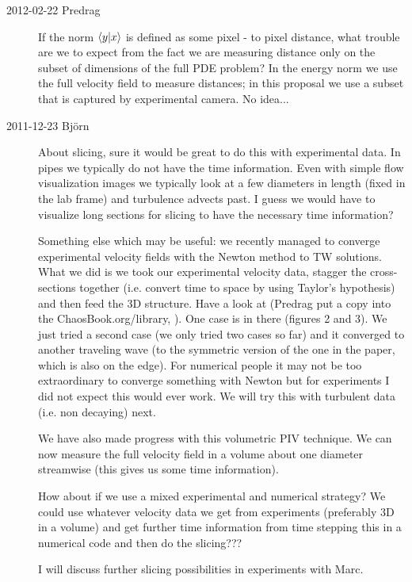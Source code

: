 \begin{description}

\item[2012-02-22 Predrag]
If the norm $\braket{y}{x}$ is defined as some pixel - to pixel distance,
what trouble are we to expect from the fact we are measuring distance
only on the subset of dimensions of the full PDE problem? In the energy
norm we use the full velocity field to measure distances; in this
proposal we use a subset that is captured by experimental camera. No
idea...

\item[2011-12-23 Bj\"orn]
About slicing, sure it would be great to do this with experimental data.
In pipes we typically do not have the time information. Even with
simple flow visualization images we typically look at a few
diameters in length (fixed in the lab frame) and turbulence advects past.
I guess we would have to visualize long sections for slicing to have the
necessary time information?

Something else which may be useful: we recently managed to converge
experimental velocity fields with the Newton method to TW solutions. What
we did is we took our experimental velocity data, stagger the
cross-sections together (i.e. convert time to space by using Taylor's
hypothesis) and then feed the 3D structure. Have a look at
 (Predrag put a copy into the ChaosBook.org/library,
).  One
case is in there (figures 2 and 3). We just tried a second case (we only
tried two cases so far) and it converged to another traveling wave (to the
symmetric version of the one in the paper, which is also on the edge). For
numerical people it may not be too extraordinary to converge something
with Newton but for experiments I did not expect this would ever work. We
will try this with turbulent data (i.e. non decaying) next.

We have also made progress with this volumetric PIV technique. We can now
measure the full velocity field in a volume about one diameter streamwise
(this gives us some time information).

How about if we use a mixed experimental and numerical strategy? We could
use whatever velocity data we get from experiments (preferably 3D in a
volume) and get further time information from time stepping this in a
numerical code and then do the slicing???

I will discuss further slicing possibilities in experiments with Marc.


\end{description}
